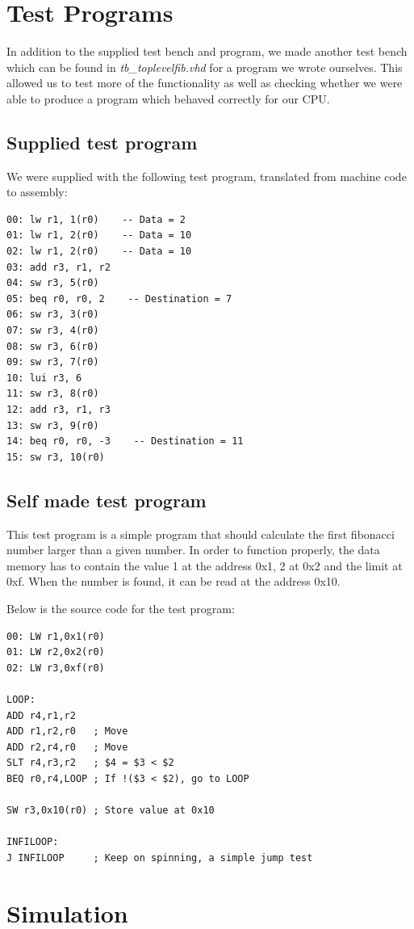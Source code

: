\section{Test Programs}
In addition to the supplied test bench and program, we made another test bench which can be found in \emph{tb_toplevelfib.vhd} for a program we wrote ourselves.
This allowed us to test more of the functionality as well as checking whether we were able to produce a program which behaved correctly for our CPU.

\subsection{Supplied test program}
We were supplied with the following test program, translated from machine code to assembly:
\begin{verbatim}
00: lw r1, 1(r0)    -- Data = 2
01: lw r1, 2(r0)    -- Data = 10
02: lw r1, 2(r0)    -- Data = 10
03: add r3, r1, r2
04: sw r3, 5(r0)
05: beq r0, r0, 2    -- Destination = 7
06: sw r3, 3(r0)
07: sw r3, 4(r0)
08: sw r3, 6(r0)
09: sw r3, 7(r0)
10: lui r3, 6
11: sw r3, 8(r0)
12: add r3, r1, r3
13: sw r3, 9(r0)
14: beq r0, r0, -3    -- Destination = 11
15: sw r3, 10(r0)
\end{verbatim}

\subsection{Self made test program}
This test program is a simple program that should calculate the first fibonacci number larger than a given number.
In order to function properly, the data memory has to contain the value 1 at the address 0x1, 2 at 0x2 and the limit at 0xf.
When the number is found, it can be read at the address 0x10.

Below is the source code for the test program:
\begin{verbatim}
00: LW r1,0x1(r0)
01: LW r2,0x2(r0)
02: LW r3,0xf(r0)

LOOP:
ADD r4,r1,r2
ADD r1,r2,r0   ; Move
ADD r2,r4,r0   ; Move
SLT r4,r3,r2   ; $4 = $3 < $2
BEQ r0,r4,LOOP ; If !($3 < $2), go to LOOP

SW r3,0x10(r0) ; Store value at 0x10

INFILOOP:
J INFILOOP     ; Keep on spinning, a simple jump test
\end{verbatim}

\section{Simulation}
